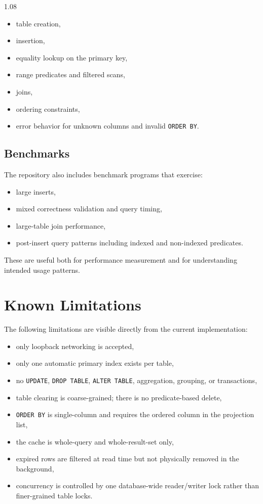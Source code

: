 \documentclass[11pt,a4paper]{article}
\begin{document}
\begin{spacing}{1.08}
\begin{itemize}
    \item table creation,
    \item insertion,
    \item equality lookup on the primary key,
    \item range predicates and filtered scans,
    \item joins,
    \item ordering constraints,
    \item error behavior for unknown columns and invalid \texttt{ORDER BY}.
\end{itemize}

\subsection{Benchmarks}

The repository also includes benchmark programs that exercise:

\begin{itemize}
    \item large inserts,
    \item mixed correctness validation and query timing,
    \item large-table join performance,
    \item post-insert query patterns including indexed and non-indexed predicates.
\end{itemize}

These are useful both for performance measurement and for understanding intended usage patterns.

\section{Known Limitations}

The following limitations are visible directly from the current implementation:

\begin{itemize}
    \item only loopback networking is accepted,
    \item only one automatic primary index exists per table,
    \item no \texttt{UPDATE}, \texttt{DROP TABLE}, \texttt{ALTER TABLE}, aggregation, grouping, or transactions,
    \item table clearing is coarse-grained; there is no predicate-based delete,
    \item \texttt{ORDER BY} is single-column and requires the ordered column in the projection list,
    \item the cache is whole-query and whole-result-set only,
    \item expired rows are filtered at read time but not physically removed in the background,
    \item concurrency is controlled by one database-wide reader/writer lock rather than finer-grained table locks.
\end{itemize}


\end{spacing}
\end{document}
